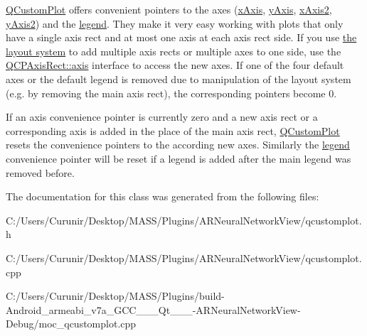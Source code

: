 \hyperlink{class_q_custom_plot}{Q\+Custom\+Plot} offers convenient pointers to the axes (\hyperlink{class_q_custom_plot_a9a79cd0158a4c7f30cbc702f0fd800e4}{x\+Axis}, \hyperlink{class_q_custom_plot_af6fea5679725b152c14facd920b19367}{y\+Axis}, \hyperlink{class_q_custom_plot_ada41599f22cad901c030f3dcbdd82fd9}{x\+Axis2}, \hyperlink{class_q_custom_plot_af13fdc5bce7d0fabd640f13ba805c0b7}{y\+Axis2}) and the \hyperlink{class_q_custom_plot_a4eadcd237dc6a09938b68b16877fa6af}{legend}. They make it very easy working with plots that only have a single axis rect and at most one axis at each axis rect side. If you use \hyperlink{}{the layout system} to add multiple axis rects or multiple axes to one side, use the \hyperlink{class_q_c_p_axis_rect_a583ae4f6d78b601b732183f6cabecbe1}{Q\+C\+P\+Axis\+Rect\+::axis} interface to access the new axes. If one of the four default axes or the default legend is removed due to manipulation of the layout system (e.\+g. by removing the main axis rect), the corresponding pointers become 0.

If an axis convenience pointer is currently zero and a new axis rect or a corresponding axis is added in the place of the main axis rect, \hyperlink{class_q_custom_plot}{Q\+Custom\+Plot} resets the convenience pointers to the according new axes. Similarly the \hyperlink{class_q_custom_plot_a4eadcd237dc6a09938b68b16877fa6af}{legend} convenience pointer will be reset if a legend is added after the main legend was removed before. 

The documentation for this class was generated from the following files\+:\begin{DoxyCompactItemize}
\item 
C\+:/\+Users/\+Curunir/\+Desktop/\+M\+A\+S\+S/\+Plugins/\+A\+R\+Neural\+Network\+View/qcustomplot.\+h\item 
C\+:/\+Users/\+Curunir/\+Desktop/\+M\+A\+S\+S/\+Plugins/\+A\+R\+Neural\+Network\+View/qcustomplot.\+cpp\item 
C\+:/\+Users/\+Curunir/\+Desktop/\+M\+A\+S\+S/\+Plugins/build-\/\+Android\+\_\+armeabi\+\_\+v7a\+\_\+\+G\+C\+C\+\_\+\_\+\_\+\+Qt\+\_\+\_\+\_-\/\+A\+R\+Neural\+Network\+View-\/\+Debug/moc\+\_\+qcustomplot.\+cpp\end{DoxyCompactItemize}
